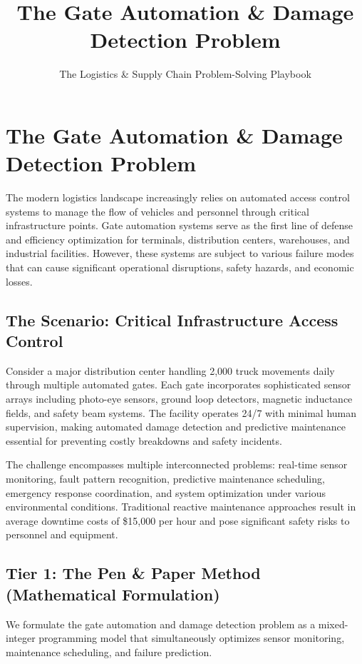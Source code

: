\documentclass{article}
\title{The Gate Automation \& Damage Detection Problem}
\author{The Logistics \& Supply Chain Problem-Solving Playbook}
\date{}
\begin{document}
\maketitle

\section{The Gate Automation \& Damage Detection Problem}

The modern logistics landscape increasingly relies on automated access control systems to manage the flow of vehicles and personnel through critical infrastructure points. Gate automation systems serve as the first line of defense and efficiency optimization for terminals, distribution centers, warehouses, and industrial facilities. However, these systems are subject to various failure modes that can cause significant operational disruptions, safety hazards, and economic losses.

\subsection{The Scenario: Critical Infrastructure Access Control}

Consider a major distribution center handling 2,000 truck movements daily through multiple automated gates. Each gate incorporates sophisticated sensor arrays including photo-eye sensors, ground loop detectors, magnetic inductance fields, and safety beam systems. The facility operates 24/7 with minimal human supervision, making automated damage detection and predictive maintenance essential for preventing costly breakdowns and safety incidents.

The challenge encompasses multiple interconnected problems: real-time sensor monitoring, fault pattern recognition, predictive maintenance scheduling, emergency response coordination, and system optimization under various environmental conditions. Traditional reactive maintenance approaches result in average downtime costs of \$15,000 per hour and pose significant safety risks to personnel and equipment.

\subsection{Tier 1: The Pen \& Paper Method (Mathematical Formulation)}

We formulate the gate automation and damage detection problem as a mixed-integer programming model that simultaneously optimizes sensor monitoring, maintenance scheduling, and failure prediction.
\end{document}
